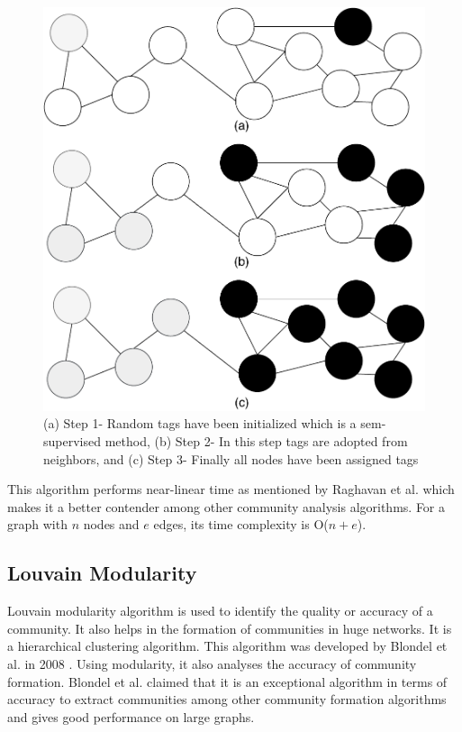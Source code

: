 \documentclass[journal,twoside,web]{ieeecolor}
\begin{document}
\begin{figure}[!h]
    \centerline{\includegraphics[scale=0.35]{figures/label_propagation.pdf}}
    \caption{(a) Step 1- Random tags have been initialized which is a sem-supervised method, (b) Step 2- In this step tags are adopted from neighbors, and (c) Step 3- Finally all nodes have been assigned tags}
    \label{fig6}
\end{figure}

This algorithm performs near-linear time as mentioned by Raghavan et al.\cite{16} which makes it a better contender among other community analysis algorithms. For a graph with $n$ nodes and $e$ edges, its time complexity is O($n + e$).

\subsection{Louvain Modularity}
Louvain modularity algorithm is used to identify the quality or accuracy of a community. It also helps in the formation of communities in huge networks. It is a hierarchical clustering algorithm. This algorithm was developed by Blondel et al. in 2008 \cite{20}. Using modularity, it also analyses the accuracy of community formation. Blondel et al. claimed that it is an exceptional algorithm in terms of accuracy to extract communities among other community formation algorithms and gives good performance on large graphs.
\end{document}
